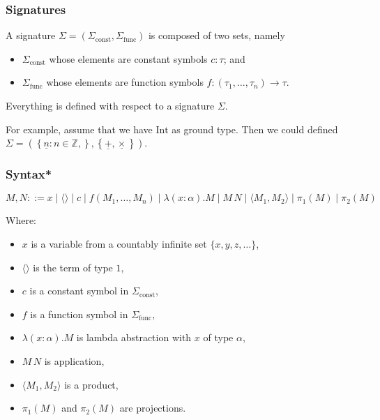 \documentclass[aspectratio=169]{beamer}
\begin{document}
\begin{frame}
\frametitle{Signatures}

\pause

A signature $\Sigma = (\Sigma_{\text{const}}, \Sigma_{\text{func}})$ is composed of two sets, namely
\begin{itemize}
    \pause
    \item $\Sigma_{\text{const}}$ whose elements are constant symbols $c : \tau$; and
    \pause
    \item $\Sigma_{\text{func}}$ whose elements are function symbols $f : (\tau_1, \ldots, \tau_n) \to \tau$.
\end{itemize}
\pause
Everything is defined with respect to a signature $\Sigma$.

\medskip

\pause
For example, assume that we have $\text{Int}$ as ground type.
Then we could defined $\Sigma = \left(\left\{\underline{n} : n \in \mathbb{Z},\right\}, \left\{\underline{+}, \underline{\times}\right\}\right)$. 

\end{frame}

\begin{frame}
\frametitle{Syntax*}

\pause

\[
M, N ::= x \mid \langle \rangle \mid c \mid f(M_1, \ldots, M_n) \mid \lambda (x: \alpha). M \mid M \, N \mid \langle M_1, M_2 \rangle \mid \pi_1(M) \mid \pi_2(M)
\]

\pause
Where:
\begin{itemize}
    \item $x$ is a variable from a countably infinite set $\{x, y, z, \ldots \}$,
    \pause
    \item $\langle \rangle$ is the term of type $1$,
    \pause
    \item $c$ is a constant symbol in $\Sigma_{\text{const}}$,
    \pause
    \item $f$ is a function symbol in $\Sigma_{\text{func}}$,
    \pause
    \item $\lambda (x: \alpha). M$ is lambda abstraction with $x$ of type $\alpha$,
    \pause
    \item $M\, N$ is application,
    \pause
    \item $\langle M_1, M_2 \rangle$ is a product,
    \pause
    \item $\pi_1(M)$ and $\pi_2(M)$ are projections.
\end{itemize}
\end{frame}
\end{document}
